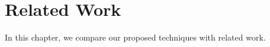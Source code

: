 \chapter{Related Work}
\label{chap:relatedwork}

In this chapter, we compare our proposed techniques with related work.

\lipsum

